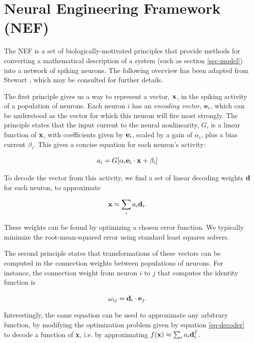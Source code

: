 \documentclass[letterpaper, 10 pt, conference]{ieeeconf}  %
\newcommand{\bolds}[1]{{\bf #1}}
\begin{document}
\section{Neural Engineering Framework (NEF)}

The NEF is a set of biologically-motivated principles that provide methods for converting a mathematical description of a system (such as section \ref{sec-model}) into a network of spiking neurons. The following overview has been adapted from Stewart \cite{stewart2012b}, which may be consulted for further details.

The first principle gives us a way to represent a vector, $\bolds{x}$, in the spiking activity of a population of neurons. Each neuron $i$ has an {\it encoding vector}, $\bolds{e}_i$, which can be understood as the vector for which this neuron will fire most strongly. The principle states that the input current to the neural nonlinearity, $G$, is a linear function of $\bolds{x}$, with coefficients given by $\bolds{e}_i$, scaled by a gain of $\alpha_i$, plus a bias current $\beta_i$. This gives a concise equation for each neuron's activity:

\begin{equation} \label{eq-neuron}
a_i = G[\alpha_i \bolds{e}_i \cdot \bolds{x} + \beta_i]
\end{equation}

To decode the vector from this activity, we find a set of linear decoding weights $\bolds{d}$ for each neuron, to approximate

\begin{equation} \label{eq-decoder}
\bolds{x} \approx \sum_i a_i \bolds{d}_i.
\end{equation}

These weights can be found by optimizing a chosen error function. We typically minimize the root-mean-squared error using standard least squares solvers.

The second principle states that transformations of these vectors can be computed in the connection weights between populations of neurons. For instance, the connection weight from neuron $i$ to $j$ that computes the identity function is

\begin{equation}
\omega_{ij} = \bolds{d}_i \cdot \bolds{e}_j.
\end{equation}

Interestingly, the same equation can be used to approximate any arbitrary function, by modifying the optimization problem given by equation \ref{eq-decoder} to decode a function of \bolds{x}, i.e. by approximating $f(\bolds{x}) \approx \sum_i a_i \bolds{d}^{f}_i$.
\end{document}
